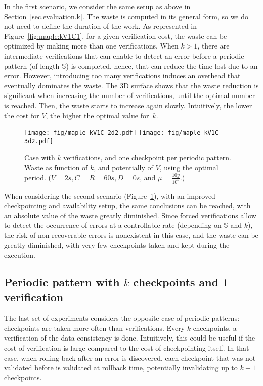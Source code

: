 \documentclass[10pt,table]{article}
\newcommand{\ema}[1]{\ensuremath{#1}\xspace}
\newcommand{\ccc}{\ema{C}}
\newcommand{\rrr}{\ema{R}}
\newcommand{\ddd}{\ema{D}}
\newcommand{\vvv}{\ema{V}}
\newcommand{\sss}{\ema{\mathbb{S}}}
\newcommand{\muplatform}{\mu}
\begin{document}
In the first scenario, we consider the same setup as above in
Section~\ref{sec.evaluation.k}.  The waste is computed in its general
form, so we do not need to define the duration of the work. As
represented in Figure~\ref{fig:maple:kV1C1}, for a given verification
cost, the waste can be optimized by making more than one 
verifications. When $k > 1$, there are intermediate verifications that
can enable to detect an error before a periodic pattern (of length
$\sss$) is completed, hence, that can reduce the time lost due to an
error.
However, introducing
too many verifications induces an overhead that eventually dominates the
waste. The 3D surface shows that the waste reduction is significant
when increasing the number of verifications, until the optimal number
is reached. Then, the waste starts to increase again
slowly. Intuitively, the lower the cost for \vvv, the higher the
optimal value for~$k$.

\begin{figure}
\begin{center}
\texttt{[image: fig/maple-kV1C-2d2.pdf]}
\texttt{[image: fig/maple-kV1C-3d2.pdf]}
\caption{Case with $k$ verifications, and one checkpoint per
  periodic  pattern. Waste as function of $k$, and potentially of $V$,
  using the optimal period.
  \footnotesize{($\vvv=2s, \ccc=\rrr=60s,
  \ddd=0s$, and $\muplatform =
  \frac{10y}{10^5}$.)}
\label{fig:maple:kV1C2}\vspace{-1\baselineskip}}
\end{center}
\end{figure}

When considering the second scenario (Figure~\ref{fig:maple:kV1C2}),
with an improved checkpointing and availability setup, the same
conclusions can be reached, with an absolute value of the waste
greatly diminished. Since forced verifications allow to detect the
occurrence of errors at a controllable rate (depending on \sss and
$k$), the risk of non-recoverable errors is nonexistent in this case,
and the waste can be greatly diminished, with very few checkpoints
taken and kept during the execution.

\subsection{Periodic pattern with $k$ checkpoints and $1$ verification}
\label{sec.evaluation.kc1v}

The last set of experiments considers the opposite case of periodic
patterns: checkpoints are taken more often than verifications. Every
$k$ checkpoints, a verification of the data consistency is
done. Intuitively, this could be useful if the cost of verification is
large compared to the cost of checkpointing itself. In that case, when
rolling back after an error is discovered, each checkpoint that was
not validated before is validated at rollback time, potentially
invalidating up to $k-1$ checkpoints.
\end{document}
